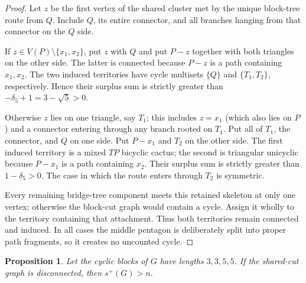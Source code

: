 \documentclass[11pt]{article}
\newtheorem{proposition}[theorem]{Proposition}
\newcommand{\spE}{s^+}
\begin{document}
\begin{proof}
Let $z$ be the first vertex of the shared cluster met by the unique block-tree
route from $Q$.  Include $Q$, its entire connector, and all branches hanging
from that connector on the $Q$ side.

If $z\in V(P)\setminus\{x_1,x_2\}$, put $z$ with $Q$ and put
$P-z$ together with both triangles on the other side.  The latter is connected
because $P-z$ is a path containing $x_1,x_2$.  The two induced territories
have cycle multisets $\{Q\}$ and $\{T_1,T_2\}$, respectively.  Hence their surplus sum is
strictly greater than $-\delta_5+1=3-\sqrt5>0$.

Otherwise $z$ lies on one triangle, say $T_1$; this includes $z=x_1$ (which
also lies on $P$) and a
connector entering through any branch rooted on $T_1$.  Put all of $T_1$, the
connector, and $Q$ on one side.  Put $P-x_1$ and $T_2$ on
the other side.  The first induced territory is a mixed $TP$ bicyclic cactus;
the second is triangular unicyclic because $P-x_1$ is a path containing
$x_2$.  Their surplus sum is strictly greater than $1-\delta_5>0$.  The case
in which the route enters through $T_2$ is symmetric.

Every remaining bridge-tree component meets this retained skeleton at only one
vertex; otherwise the block-cut graph would contain a cycle.  Assign it wholly
to the territory containing that attachment.  Thus both territories remain
connected and induced.  In all cases the middle pentagon is deliberately
split into proper path fragments, so it creates no uncounted cycle.
\end{proof}

\begin{proposition}\label{prop:3355}
Let the cyclic blocks of $G$ have lengths $3,3,5,5$.  If the shared-cut graph
is disconnected, then $\spE(G)>n$.
\end{proposition}
\end{document}
